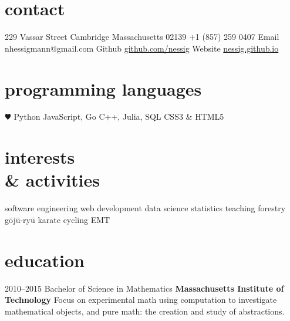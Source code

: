 \documentclass[11pt]{friggeri-cv}
\begin{document}


\begin{aside} %
\section{contact}
229 Vassar Street
Cambridge
Massachusetts 02139
+1 (857) 259 0407
{{\FA \faEnvelope} Email}
{\footnotesize nhessigmann@gmail.com}
{{\FA \faGithub} Github}
{\footnotesize \href{http://github.com/nessig}{github.com/nessig}}
{{\FA \faHome} Website}
{\footnotesize \href{https://nessig.github.io}{ nessig.github.io}}
\section{programming languages}
{\color{red} $\varheartsuit$} Python
JavaScript, Go
C++, Julia, SQL
CSS3 \& HTML5
\section{interests\\ \& activities}
software engineering
web development
data science
statistics
teaching
forestry
g\={o}j\={u}-ry\={u} karate
cycling
EMT
\end{aside}


\section{education}

\begin{entrylist}


\entry
{2010--2015}
{Bachelor of Science in Mathematics}
{\textbf{Massachusetts Institute of Technology}}
{Focus on experimental math using computation to investigate mathematical objects, and pure math: the creation and study of abstractions.
}
\end{entrylist}
\end{document}

